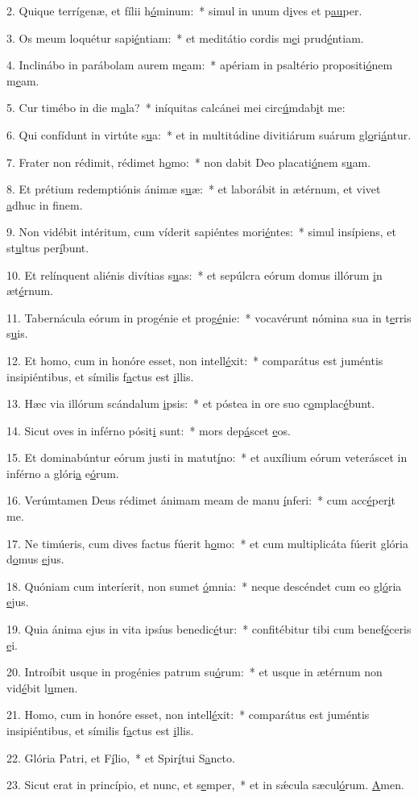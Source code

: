 2. Quique terrígenæ, et fílii h\uline{ó}minum:~* simul in unum d\uline{i}ves et p\uline{au}per.\par 
3. Os meum loquétur sapi\uline{é}ntiam:~* et meditátio cordis m\uline{e}i prud\uline{é}ntiam.\par 
4. Inclinábo in parábolam aurem m\uline{e}am:~* apériam in psaltério propositi\uline{ó}nem m\uline{e}am.\par 
5. Cur timébo in die m\uline{a}la?~* iníquitas calcánei mei circ\uline{ú}mdab\uline{i}t me:\par 
6. Qui confídunt in virtúte s\uline{u}a:~* et in multitúdine divitiárum suárum gl\uline{o}ri\uline{á}ntur.\par 
7. Frater non rédimit, rédimet h\uline{o}mo:~* non dabit Deo placati\uline{ó}nem s\uline{u}am.\par 
8. Et prétium redemptiónis ánimæ s\uline{u}æ:~* et laborábit in ætérnum, et vivet \uline{a}dhuc in f\uline{i}nem.\par 
9. Non vidébit intéritum, cum víderit sapiéntes mori\uline{é}ntes:~* simul insípiens, et st\uline{u}ltus per\uline{í}bunt.\par 
10. Et relínquent aliénis divítias s\uline{u}as:~* et sepúlcra eórum domus illórum \uline{i}n æt\uline{é}rnum.\par 
11. Tabernácula eórum in progénie et prog\uline{é}nie:~* vocavérunt nómina sua in t\uline{e}rris s\uline{u}is.\par 
12. Et homo, cum in honóre esset, non intell\uline{é}xit:~* comparátus est juméntis insipiéntibus, et símilis f\uline{a}ctus est \uline{i}llis.\par 
13. Hæc via illórum scándalum \uline{i}psis:~* et póstea in ore suo c\uline{o}mplac\uline{é}bunt.\par 
14. Sicut oves in inférno pósit\uline{i} sunt:~* mors dep\uline{á}scet \uline{e}os.\par 
15. Et dominabúntur eórum justi in matut\uline{í}no:~* et auxílium eórum veteráscet in inférno a glóri\uline{a} e\uline{ó}rum.\par 
16. Verúmtamen Deus rédimet ánimam meam de manu \uline{í}nferi:~* cum acc\uline{é}per\uline{i}t me.\par 
17. Ne timúeris, cum dives factus fúerit h\uline{o}mo:~* et cum multiplicáta fúerit glória d\uline{o}mus \uline{e}jus.\par 
18. Quóniam cum interíerit, non sumet \uline{ó}mnia:~* neque descéndet cum eo gl\uline{ó}ria \uline{e}jus.\par 
19. Quia ánima ejus in vita ipsíus benedic\uline{é}tur:~* confitébitur tibi cum benef\uline{é}ceris \uline{e}i.\par 
20. Introíbit usque in progénies patrum su\uline{ó}rum:~* et usque in ætérnum non vid\uline{é}bit l\uline{u}men.\par 
21. Homo, cum in honóre esset, non intell\uline{é}xit:~* comparátus est juméntis insipiéntibus, et símilis f\uline{a}ctus est \uline{i}llis.\par 
22. Glória Patri, et F\uline{í}lio,~* et Spir\uline{í}tui S\uline{a}ncto.\par 
23. Sicut erat in princípio, et nunc, et s\uline{e}mper,~* et in sǽcula sæcul\uline{ó}rum. \uline{A}men.\par 
